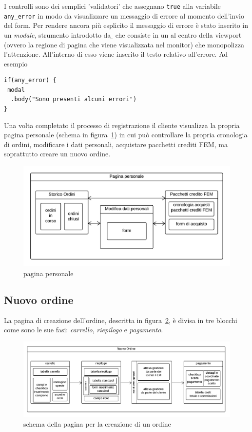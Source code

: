 I controlli sono dei semplici 'validatori' che assegnano \texttt{true} alla variabile \texttt{any\_error} in modo da visualizzare un messaggio di errore al momento dell'invio del form. Per rendere ancora più esplicito il messaggio di errore è stato inserito in un \emph{modale}, strumento introdotto da {\b} che consiste in un  al centro della viewport (ovvero la regione di pagina che viene visualizzata nel monitor) che monopolizza l'attenzione. All'interno di esso viene inserito il testo relativo all'errore. Ad esempio
\begin{verbatim}
if(any_error) {
 modal
  .body("Sono presenti alcuni errori")
}
\end{verbatim}

Una volta completato il processo di registrazione il cliente visualizza la propria pagina personale (schema in figura~\ref{fig:pagina-personale-s}) in cui può controllare la propria cronologia di ordini, modificare i dati personali, acquistare pacchetti crediti FEM, ma soprattutto creare un nuovo ordine.

\begin{figure}
 \includegraphics[width=1\textwidth]{images/pagina-personale-s} 
 \caption{pagina personale}
 \label{fig:pagina-personale-s}
\end{figure}

\subsection*{Nuovo ordine}
\label{subs:pno}
La pagina di creazione dell'ordine, descritta in figura~\ref{fig:nuovo-ordine-s}, è divisa in tre blocchi come sono le sue fasi: \emph{carrello}, \emph{riepilogo} e \emph{pagamento}.

\begin{figure}
 \includegraphics[width=1\textwidth]{images/nuovo-ordine-s} 
 \caption{schema della pagina per la creazione di un ordine}
 \label{fig:nuovo-ordine-s}
\end{figure}

